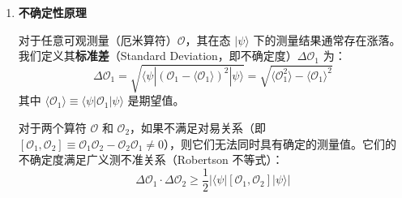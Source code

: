 \begin{postulate}[测量]
\begin{enumerate}
    \item \textbf{不确定性原理}
    
    对于任意可观测量（厄米算符）$\mathscr{O}$，其在态 $|\psi\rangle$ 下的测量结果通常存在涨落。我们定义其\textbf{标准差}（Standard Deviation，即不确定度）$\Delta \mathscr{O}_1$ 为：
    \begin{equation}
        \Delta \mathscr{O}_1 = \sqrt{\langle \psi | (\mathscr{O}_1 - \langle \mathscr{O}_1 \rangle)^2 | \psi \rangle} = \sqrt{\langle \mathscr{O}_1^2 \rangle - \langle \mathscr{O}_1 \rangle^2}
    \end{equation}
    其中 $\langle \mathscr{O}_1 \rangle \equiv \langle \psi | \mathscr{O}_1 | \psi \rangle$ 是期望值。
    
    对于两个算符 $\mathscr{O}$ 和 $\mathscr{O}_2$，如果不满足对易关系（即 $[\mathscr{O}_1, \mathscr{O}_2] \equiv \mathscr{O}_1\mathscr{O}_2 - \mathscr{O}_2\mathscr{O}_1 \neq 0$），则它们无法同时具有确定的测量值。它们的不确定度满足广义测不准关系（Robertson 不等式）：
    \begin{equation}
        \Delta \mathscr{O}_1 \cdot \Delta \mathscr{O}_2 \ge \frac{1}{2} \left| \langle \psi | [\mathscr{O}_1, \mathscr{O}_2] | \psi \rangle \right|
    \end{equation}
\end{enumerate}
\end{postulate}








